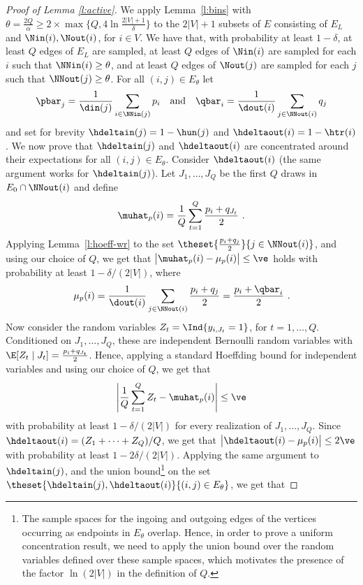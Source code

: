 \begin{proof}[Proof of Lemma \ref{l:active}]
We apply Lemma~\ref{l:bins} with $\theta = \tfrac{2Q}{\alpha} \ge 2\times\max\big\{Q,4\ln \frac{2|V|+1}{\delta}\big\}$ to the $2|V|+1$ subsets of $E$ consisting of $E_L$ and $\Nin(i),\Nout(i)$, for $i \in V$. We have that, with probability at least $1-\delta$, at least $Q$ edges of $E_L$ are sampled, at least $Q$ edges of $\Nin(i)$ are sampled for each $i$ such that $\NNin(i) \ge \theta$, and at least $Q$ edges of $\Nout(j)$ are sampled for each $j$ such that $\NNout(j) \ge \theta$.
For all $(i,j) \in E_{\theta}$ let
\[
	\pbar_j = \frac{1}{\din(j)}\sum_{i\in\NNin(j)} p_i \quad\text{and}\quad \qbar_i = \frac{1}{\dout(i)}\sum_{j\in\NNout(i)} q_j
\]
and set for brevity $\hdeltain(j) = 1-\hun(j)$ and $\hdeltaout(i) = 1-\htr(i)$.
We now prove that $\hdeltain(j)$ and $\hdeltaout(i)$ are concentrated around their expectations for all $(i,j) \in E_{\theta}$. Consider $\hdeltaout(i)$ (the same argument works for $\hdeltain(j)$). Let $J_1,\dots,J_Q$ be the first $Q$ draws in $E_0 \cap \NNout(i)$ and define
\[
	\muhat_p(i) = \frac{1}{Q} \sum_{t=1}^Q \frac{p_i+q_{J_t}}{2}~.
\]
Applying Lemma~\ref{l:hoeff-wr} to the set $\theset{\tfrac{p_i+q_j}{2}}{j \in \NNout(i)}$, and using our choice of $Q$, we get that $\big|\muhat_p(i) - \mu_p(i)\big| \le \ve$ holds with probability at least $1-\delta/(2|V|)$, where
\[
	\mu_p(i) = \frac{1}{\dout(i)}\sum_{j \in \NNout(i)} \frac{p_i + q_j}{2} = \frac{p_i + \qbar_i}{2}~.
\]
Now consider the random variables $Z_t = \Ind{y_{i,J_t}=1}$, for $t=1,\dots,Q$. Conditioned on $J_1,\dots,J_Q$, these are independent Bernoulli random variables with $\E[Z_t \mid J_t] = \tfrac{p_i+q_{J_t}}{2}$. Hence, applying a standard Hoeffding bound for independent variables and using our choice of $Q$, we get that
\[
	\left|\frac{1}{Q}\sum_{t=1}^Q Z_t - \muhat_p(i) \right| \le \ve 
\]
with probability at least $1-\delta/(2|V|)$ for every realization of $J_1,\dots,J_Q$. 
%
Since $\hdeltaout(i) = (Z_1+\cdots+Z_Q)/Q$, we get that $\big|\hdeltaout(i) - \mu_p(i)\big| \le 2\ve$ with probability at least $1-2\delta/(2|V|)$. Applying the same argument to $\hdeltain(j)$, and the union bound\footnote
{
The sample spaces for the ingoing and outgoing edges of the vertices occurring as endpoints in $E_{\theta}$ overlap. Hence, in order to prove a uniform concentration result, we need to apply the union bound over the random variables defined over these sample spaces, which motivates the presence of the factor $\ln(2|V|)$ in the definition of $Q$. 
}
on the set $\theset{\hdeltain(j),\hdeltaout(i)}{(i,j) \in E_{\theta}}$, we get that

\end{proof}
